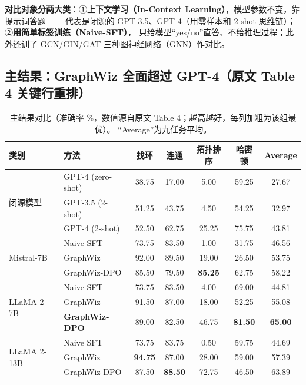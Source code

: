 \documentclass[11pt,UTF8,fontset=fandol]{ctexart}
\begin{document}
\textbf{对比对象分两大类}：①\textbf{上下文学习（In-Context Learning）}，模型参数不变，靠提示词答题——
代表是闭源的 GPT-3.5、GPT-4（用零样本和 2-shot 思维链）；②\textbf{用简单标签训练（Naive-SFT）}，
只给模型“yes/no”直答、不给推理过程；此外还训了 GCN/GIN/GAT 三种图神经网络（GNN）作对比。

\subsection{主结果：GraphWiz 全面超过 GPT-4（原文 Table 4 关键行重排）}

\begin{table}[H]\centering
\caption{主结果对比（准确率 \%，数值源自原文 Table 4；越高越好，每列加粗为该组最优）。
“Average”为九任务平均。}
\begin{tabular}{llccccc}
\toprule
\textbf{类别} & \textbf{方法} & \textbf{找环} & \textbf{连通} & \textbf{拓扑排序} & \textbf{哈密顿} & \textbf{Average} \\
\midrule
\multirow{3}{*}{闭源模型}
 & GPT-4 (zero-shot) & 38.75 & 17.00 & 5.00 & 59.25 & 27.67 \\
 & GPT-3.5 (2-shot)  & 51.25 & 43.75 & 4.50 & 54.25 & 32.97 \\
 & GPT-4 (2-shot)    & 52.50 & 62.75 & 25.25 & 75.75 & 43.81 \\
\midrule
\multirow{3}{*}{Mistral-7B}
 & Naive SFT      & 73.75 & 83.50 & 1.00 & 31.75 & 46.56 \\
 & GraphWiz       & 92.00 & 89.50 & 19.00 & 26.50 & 53.75 \\
 & GraphWiz-DPO   & 85.50 & 79.50 & \textbf{85.25} & 62.75 & 58.22 \\
\midrule
\multirow{3}{*}{LLaMA 2-7B}
 & Naive SFT      & 73.75 & 83.50 & 4.00 & 69.00 & 44.81 \\
 & GraphWiz       & 91.50 & 87.00 & 18.00 & 52.25 & 55.08 \\
 & \textbf{GraphWiz-DPO} & 89.00 & 82.50 & 46.75 & \textbf{81.50} & \textbf{65.00} \\
\midrule
\multirow{3}{*}{LLaMA 2-13B}
 & Naive SFT      & 73.75 & 83.75 & 0.50 & 59.75 & 44.69 \\
 & GraphWiz       & \textbf{94.75} & 87.00 & 28.00 & 59.00 & 57.39 \\
 & GraphWiz-DPO   & 87.50 & \textbf{88.50} & 72.75 & 46.50 & 63.89 \\
\bottomrule
\end{tabular}
\end{table}
\end{document}

